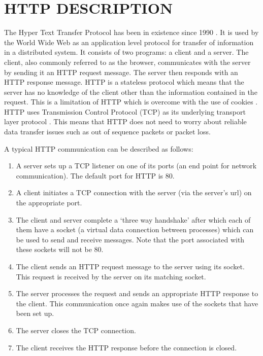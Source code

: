 \documentclass[10pt,twocolumn]{witseiepaper}
\begin{document}
\section{HTTP DESCRIPTION}

The Hyper Text Transfer Protocol has been in existence since 1990 \cite{rfc7230}. It is used by the World Wide Web as an application level protocol for transfer of information in a distributed system. It consists of two programs: a client and a server. The client, also commonly referred to as the browser, communicates with the server by sending it an HTTP request message. The server then responds with an HTTP response message. HTTP is a stateless protocol which means that the server has no knowledge of the client other than the information contained in the request. This is a limitation of HTTP which is overcome with the use of cookies \cite{kurose}. HTTP uses Transmission Control Protocol (TCP) as its underlying transport layer protocol \cite{kurose}. This means that HTTP does not need to worry about reliable data transfer issues such as out of sequence packets or packet loss.  

A typical HTTP communication can be described as follows: 
\begin{enumerate}
	\item A server sets up a TCP listener on one of its ports (an end point for network communication). The default port for HTTP is 80. 
	\item A client initiates a TCP connection with the server (via the server's url) on the appropriate port. 
	\item The client and server complete a `three way handshake' after which each of them have a socket (a virtual data connection between processes) which can be used to send and receive messages. Note that the port associated with these sockets will not be 80.
	\item The client sends an HTTP request message to the server using its socket. This request is received by the server on its matching socket.
	\item The server processes the request and sends an appropriate HTTP response to the client. This communication once again makes use of the sockets that have been set up. 
	\item The server closes the TCP connection.
	\item The client receives the HTTP response before the connection is closed.
\end{enumerate}
\end{document}
